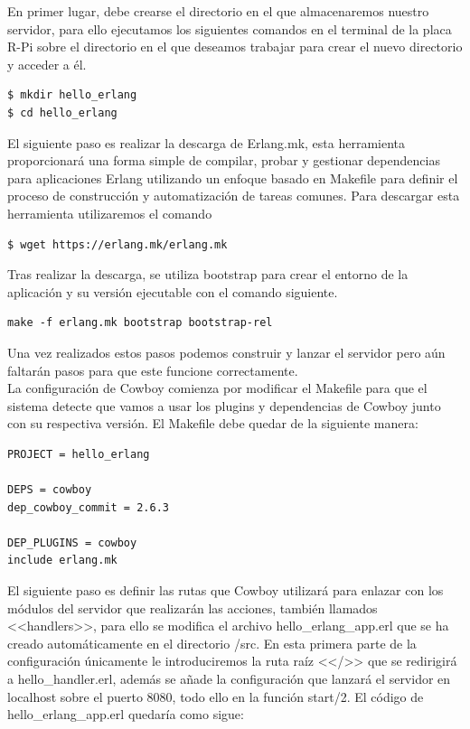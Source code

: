 En primer lugar, debe crearse el directorio en el que almacenaremos nuestro servidor, para ello ejecutamos los siguientes comandos en el terminal de la placa R-Pi sobre el directorio en el que deseamos trabajar para crear el nuevo directorio y acceder a él.\\ 

\begin{lstlisting}[style=terminal]
$ mkdir hello_erlang
$ cd hello_erlang
\end{lstlisting}

El siguiente paso es realizar la descarga de Erlang.mk, esta herramienta proporcionará una forma simple de compilar, probar y gestionar dependencias para aplicaciones Erlang utilizando un enfoque basado en Makefile para definir el proceso de construcción y automatización de tareas comunes. Para descargar esta herramienta utilizaremos el comando\\

\begin{lstlisting}[style=terminal]
$ wget https://erlang.mk/erlang.mk
\end{lstlisting}

Tras realizar la descarga, se utiliza bootstrap para crear el entorno de la aplicación y su versión ejecutable con el comando siguiente.

\begin{lstlisting}[style=terminal]
make -f erlang.mk bootstrap bootstrap-rel
\end{lstlisting}

Una vez realizados estos pasos podemos construir y lanzar el servidor pero aún faltarán pasos para que este funcione correctamente.\\

La configuración de Cowboy comienza por modificar el Makefile para que el sistema detecte que vamos a usar los plugins y dependencias de Cowboy junto con su respectiva versión. El Makefile debe quedar de la siguiente manera:\\

\lstset{language=C, breaklines=true, basicstyle=\sffamily\footnotesize}
\begin{lstlisting}[frame=single]
PROJECT = hello_erlang

DEPS = cowboy
dep_cowboy_commit = 2.6.3

DEP_PLUGINS = cowboy
include erlang.mk
\end{lstlisting}

El siguiente paso es definir las rutas que Cowboy utilizará para enlazar con los módulos del servidor que realizarán las acciones, también llamados <<handlers>>, para ello se modifica el archivo hello\_erlang\_app.erl que se ha creado automáticamente en el directorio /src. En esta primera parte de la configuración únicamente le introduciremos la ruta raíz <</>> que se redirigirá a hello\_handler.erl, además se añade la configuración que lanzará el servidor en localhost sobre el puerto 8080, todo ello en la función start/2. El código de hello\_erlang\_app.erl quedaría como sigue:\\

